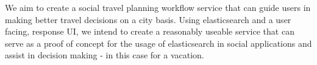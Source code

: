 We aim to create a social travel planning workflow service that can guide users in making better travel decisions on a city basis. Using elasticsearch and a user facing, response UI, we intend to create a reasonably useable service that can serve as a proof of concept for the usage of elasticsearch in social applications and assist in decision making - in this case for a vacation.
